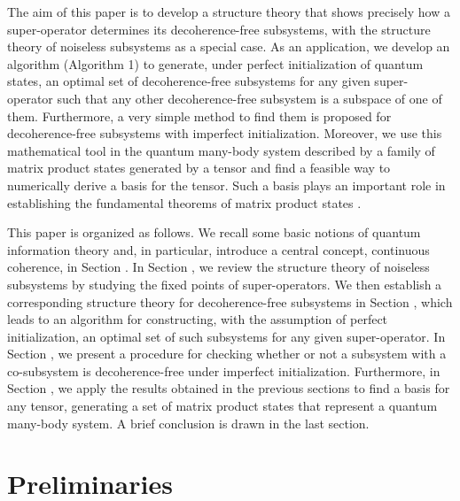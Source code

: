 \documentclass[journal]{IEEEtran}
\begin{document}
The aim of this paper is to develop a structure theory that shows precisely how a super-operator determines its decoherence-free subsystems, with the structure theory of noiseless subsystems as a special case. As an application, we develop an algorithm (Algorithm 1) to generate, under perfect initialization of quantum states, an optimal set of decoherence-free subsystems for any given super-operator such that any other decoherence-free subsystem is a subspace of one of them. Furthermore, a very simple  method to find them is proposed for decoherence-free subsystems with imperfect initialization. 
Moreover, we use this mathematical tool in the quantum many-body system described by a family of matrix product states generated by a tensor and find a  feasible way to numerically derive a basis for the tensor. Such a basis plays an important role in establishing the fundamental theorems of matrix product states \cite{cirac2017matrix,cuevas2017irreducible}.

This paper is organized as follows. We recall some basic notions of quantum information theory and, in particular, introduce a central concept, continuous coherence,  in Section \uppercase\expandafter{}. In Section \uppercase\expandafter{}, we review the structure theory of noiseless subsystems by studying the fixed points of super-operators. We then establish a corresponding structure theory for decoherence-free subsystems in Section \uppercase\expandafter{}, which leads to an algorithm for constructing, with the assumption of perfect initialization, an optimal set of  such subsystems  for any given super-operator. In Section \uppercase\expandafter{}, we present a procedure for checking whether or not a subsystem with a co-subsystem is decoherence-free under imperfect initialization. Furthermore, in Section \uppercase\expandafter{}, 
we apply the results obtained in the previous sections to find a basis for any tensor, generating a set of matrix product states that represent a quantum many-body system. A brief conclusion is drawn in the last section.

\section{Preliminaries}
\end{document}
